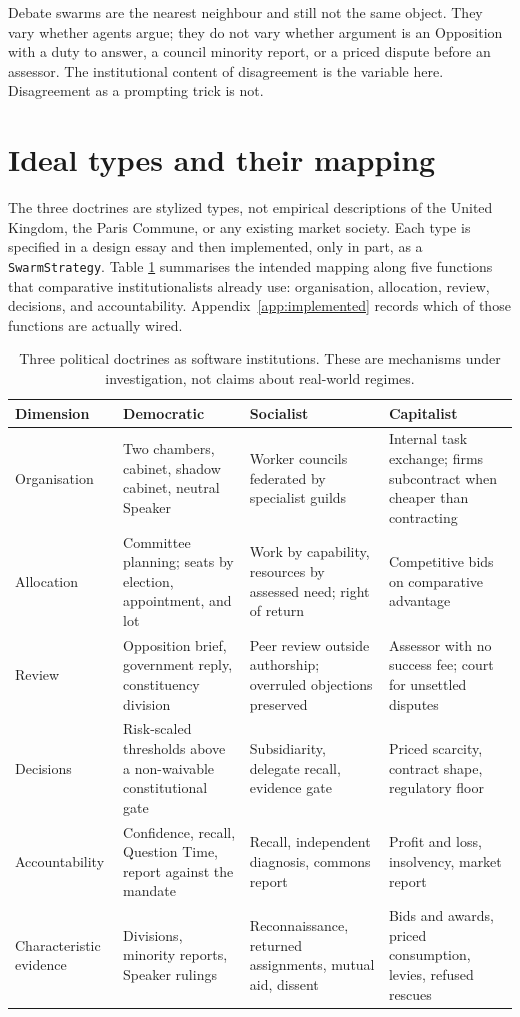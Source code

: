 \documentclass[11pt,a4paper]{article}
\begin{document}
Debate swarms \citep{du2024} are the nearest neighbour and still not the same object.
They vary whether agents argue; they do not vary whether argument is an Opposition with
a duty to answer, a council minority report, or a priced dispute before an assessor.
The institutional content of disagreement is the variable here. Disagreement as a
prompting trick is not.

\section{Ideal types and their mapping}
\label{sec:types}

The three doctrines are stylized types, not empirical descriptions of the United Kingdom,
the Paris Commune, or any existing market society. Each type is specified in a design
essay and then implemented, only in part, as a \texttt{SwarmStrategy}. Table
\ref{tab:doctrines} summarises the intended mapping along five functions that comparative
institutionalists already use: organisation, allocation, review, decisions, and
accountability. Appendix~\ref{app:implemented} records which of those functions are
actually wired.

\begin{table}[t]
\centering
\small
\caption{Three political doctrines as software institutions. These are mechanisms under
investigation, not claims about real-world regimes.}
\label{tab:doctrines}
\begin{tabular}{@{}p{2.15cm}p{3.55cm}p{3.55cm}p{3.55cm}@{}}
\toprule
Dimension & Democratic & Socialist & Capitalist \\
\midrule
Organisation &
Two chambers, cabinet, shadow cabinet, neutral Speaker &
Worker councils federated by specialist guilds &
Internal task exchange; firms subcontract when cheaper than contracting \\
Allocation &
Committee planning; seats by election, appointment, and lot &
Work by capability, resources by assessed need; right of return &
Competitive bids on comparative advantage \\
Review &
Opposition brief, government reply, constituency division &
Peer review outside authorship; overruled objections preserved &
Assessor with no success fee; court for unsettled disputes \\
Decisions &
Risk-scaled thresholds above a non-waivable constitutional gate &
Subsidiarity, delegate recall, evidence gate &
Priced scarcity, contract shape, regulatory floor \\
Accountability &
Confidence, recall, Question Time, report against the mandate &
Recall, independent diagnosis, commons report &
Profit and loss, insolvency, market report \\
Characteristic evidence &
Divisions, minority reports, Speaker rulings &
Reconnaissance, returned assignments, mutual aid, dissent &
Bids and awards, priced consumption, levies, refused rescues \\
\bottomrule
\end{tabular}
\end{table}
\end{document}
